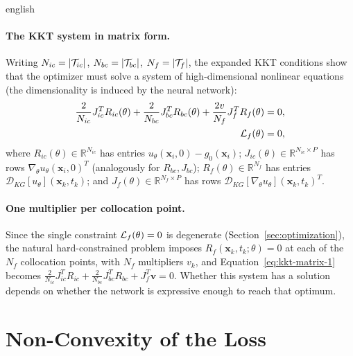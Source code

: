 \documentclass[0000.tex]{subfiles}
\begin{document}
\begin{hyphenrules}{english}
\paragraph{The KKT system in matrix form.}
Writing $N_{ic}=\left\lvert \mathcal{T}_{ic} \right\rvert$, $N_{bc}=\left\lvert \mathcal{T}_{bc} \right\rvert$, $N_f=\left\lvert \mathcal{T}_f \right\rvert$, the expanded KKT conditions
show that the optimizer must solve a system of high-dimensional nonlinear equations (the
dimensionality is induced by the neural network):
\begin{align}
  \frac{2}{N_{ic}}J_{ic}^{T}R_{ic}(\theta)+\frac{2}{N_{bc}}J_{bc}^{T}R_{bc}(\theta)
  +\frac{2v}{N_f}J_f^{T}R_f(\theta)&=0, \label{eq:kkt-matrix-1}\\
  \mathcal{L}_f(\theta)&=0, \label{eq:kkt-matrix-2}
\end{align}
where $R_{ic}(\theta)\in\mathbb{R}^{N_{ic}}$ has entries $u_\theta(\mathbf{x}_i,0)-g_0(\mathbf{x}_i)$;
$J_{ic}(\theta)\in\mathbb{R}^{N_{ic}\times P}$ has rows $\nabla_\theta u_\theta(\mathbf{x}_i,0)^{T}$ (analogously for
$R_{bc},J_{bc}$); $R_f(\theta)\in\mathbb{R}^{N_f}$ has entries $\mathcal{D}_{KG}[u_\theta](\mathbf{x}_k,t_k)$; and
$J_f(\theta)\in\mathbb{R}^{N_f\times P}$ has rows $\mathcal{D}_{KG}[\nabla_\theta u_\theta](\mathbf{x}_k,t_k)^{T}$.

\paragraph{One multiplier per collocation point.}
Since the single constraint $\mathcal{L}_f(\theta)=0$ is degenerate (Section~\ref{sec:optimization}), the natural
hard-constrained problem imposes $R_f(\mathbf{x}_k,t_k;\theta)=0$ at each of the $N_f$ collocation points,
with $N_f$ multipliers $v_k$, and Equation~\eqref{eq:kkt-matrix-1} becomes
$\frac{2}{N_{ic}}J_{ic}^{T}R_{ic}+\frac{2}{N_{bc}}J_{bc}^{T}R_{bc}+J_f^{T}\mathbf{v}=0$. Whether this
system has a solution depends on whether the network is expressive enough to reach that optimum.

\section{Non-Convexity of the Loss}\label{app-sec:nonconvexity}


\end{hyphenrules}
\end{document}
